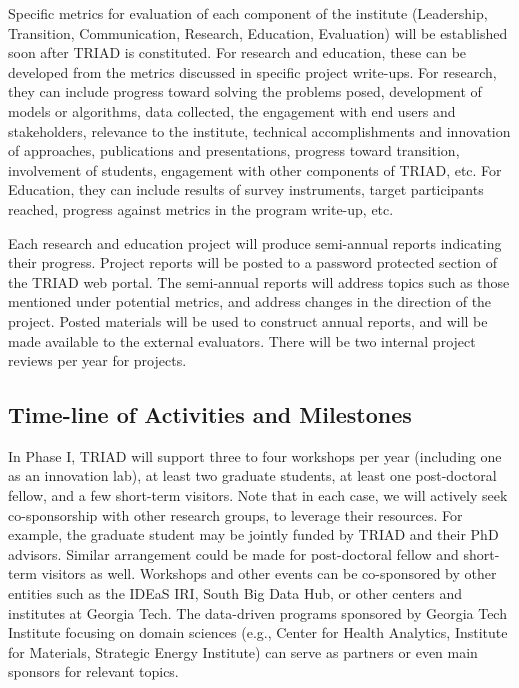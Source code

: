 \documentclass[12pt]{article}
\begin{document}
Specific metrics for evaluation of each component of the institute (Leadership, Transition, Communication, Research, Education, Evaluation) will be established soon after TRIAD is constituted. For research and education, these can be developed from the metrics discussed in specific project write-ups. For research, they can include progress toward solving the problems posed, development of models or algorithms, data collected, the engagement with end users and stakeholders, relevance to the institute, technical accomplishments and innovation of approaches, publications and presentations, progress toward transition, involvement of students, engagement with other components of TRIAD, etc.
For Education, they can include results of survey instruments, target participants reached, progress against metrics in the program write-up, etc.

Each research and education project will produce semi-annual reports indicating their
progress. Project reports will be posted to a
password protected section of the TRIAD web portal. The semi-annual reports will address
topics such as those mentioned under potential metrics, and address changes in the
direction of the project. Posted materials will be used to construct annual reports,
and will be made available to the external evaluators. There will be two internal project reviews per year for projects.\vspace*{-0.15in}



\subsection{Time-line of Activities and Milestones}
In Phase I, TRIAD will support three to four workshops per year (including one as an innovation lab), at least two graduate students, at least one post-doctoral fellow, and a few short-term visitors.
Note that in each case, we will actively seek co-sponsorship with other research groups, to leverage their resources.
For example, the graduate student may be jointly funded by TRIAD and their PhD advisors.
Similar arrangement could be made for post-doctoral fellow and short-term visitors as well.
Workshops and other events can be co-sponsored by other entities such as the IDEaS IRI,
South Big Data Hub, or other centers and institutes at Georgia Tech. The data-driven
programs sponsored by Georgia Tech Institute focusing on domain sciences (e.g., Center for Health Analytics, Institute for Materials, Strategic Energy Institute) can serve as partners
or even main sponsors for relevant topics.
\end{document}
